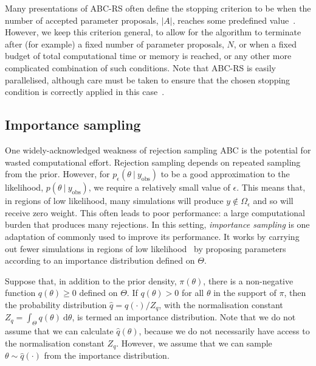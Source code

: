 \documentclass[12pt, onecolumn]{article}
\newcommand{\obs}[1]{#1_{\mathrm{obs}}}
\begin{document}
Many presentations of ABC-RS often define the stopping criterion to be when the number of accepted parameter proposals, $|A|$, reaches some predefined value~\cite{Beaumont2010,Sisson2018}.
However, we keep this criterion general, to allow for the algorithm to terminate after (for example) a fixed number of parameter proposals, $N$, or when a fixed budget of total computational time or memory is reached, or any other more complicated combination of such conditions.
Note that ABC-RS is easily parallelised, although care must be taken to ensure that the chosen stopping condition is correctly applied in this case~\cite{Jagiella2017}.

\subsection{Importance sampling}
\label{s:ImportanceSampling}

One widely-acknowledged weakness of rejection sampling ABC is the potential for wasted computational effort. 
Rejection sampling depends on repeated sampling from the prior. 
However, for $p_\epsilon(\theta~|~\obs y)$ to be a good approximation to the likelihood, $p(\theta~|~\obs y)$, we require a relatively small value of $\epsilon$.
This means that, in regions of low likelihood, many simulations will produce $y \notin \Omega_\epsilon$ and so will receive zero weight.
This often leads to poor performance: a large computational burden that produces many rejections.
In this setting, \emph{importance sampling} is one adaptation of  commonly used to improve its performance.
It works by carrying out fewer simulations in regions of low likelihood~\cite{Owen2013,Sisson2018} by proposing parameters according to an importance distribution defined on $\Theta$.

Suppose that, in addition to the prior density, $\pi(\theta)$, there is a non-negative function $q(\theta) \geq 0$ defined on $\Theta$.
If $q(\theta)>0$ for all $\theta$ in the support of $\pi$, then the probability distribution $\hat q = q(\cdot)/Z_q$, with the normalisation constant $Z_q = \int_\Theta q(\theta) ~\mathrm d\theta$, is termed an importance distribution.
Note that we do not assume that we can calculate $\hat q(\theta)$, because we do not necessarily have access to the normalisation constant $Z_q$.
However, we assume that we can sample $\theta \sim \hat q(\cdot)$ from the importance distribution.
\end{document}
